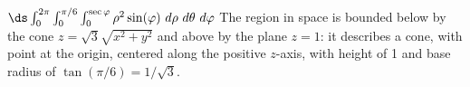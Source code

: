 {
$\ds \int_0^{2\pi}\int_{0}^{\pi/6}\int_0^{\sec \varphi} \rho^2\sin(\varphi)\ d\rho\ d\theta\ d\varphi$
}
{The region in space is bounded below by the cone $z=\sqrt{3}\sqrt{x^2+y^2}$ and above by the plane $z=1$: it describes a cone, with point at the origin, centered along the positive $z$-axis, with height of 1 and base radius  of $\tan(\pi/6) = 1/\sqrt{3}$.
}
